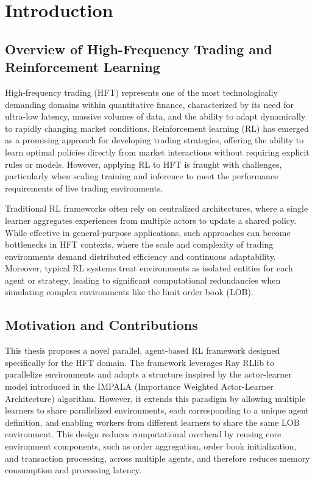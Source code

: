 \section{Introduction}

\subsection{Overview of High-Frequency Trading and Reinforcement Learning}
High-frequency trading (HFT) represents one of the most technologically demanding domains within quantitative finance,
characterized by its need for ultra-low latency, massive volumes of data, and the ability to adapt dynamically to rapidly changing market conditions.
Reinforcement learning (RL) has emerged as a promising approach for developing trading strategies,
offering the ability to learn optimal policies directly from market interactions without requiring explicit rules or models.
However, applying RL to HFT is fraught with challenges, particularly when scaling training and inference to meet the performance
requirements of live trading environments.

Traditional RL frameworks often rely on centralized architectures, where a single learner aggregates experiences from multiple actors to update a shared policy.
While effective in general-purpose applications, such approaches can become bottlenecks in HFT contexts,
where the scale and complexity of trading environments demand distributed efficiency and continuous adaptability.
Moreover, typical RL systems treat environments as isolated entities for each agent or strategy,
leading to significant computational redundancies when simulating complex environments like the limit order book (LOB).

\subsection{Motivation and Contributions}

This thesis proposes a novel parallel, agent-based RL framework designed specifically for the HFT domain.
The framework leverages Ray RLlib to parallelize environments and adopts a structure inspired by the actor-learner model introduced in the
IMPALA (Importance Weighted Actor-Learner Architecture) algorithm.
However, it extends this paradigm by allowing multiple learners to share parallelized environments, each corresponding to a unique agent definition,
and enabling workers from different learners to share the same LOB environment.
This design reduces computational overhead by reusing core environment components, such as order aggregation, order book initialization,
and transaction processing, across multiple agents, and therefore reduces memory consumption and processing latency.

